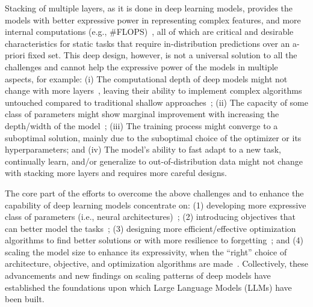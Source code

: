 \documentclass{article}
\newcommand{\citep}{\parencite}
\begin{document}
Stacking of multiple layers, as it is done in deep learning models, provides the models with better expressive power in representing complex features, and more internal computations (e.g., \#FLOPS)~\citep{montufar2014number, poole2016exponential, hestness2017deep}, all of which are critical and desirable characteristics for static tasks that require in-distribution predictions over an a-priori fixed set. This deep design, however, is not a universal solution to all the challenges and cannot help the expressive power of the models in multiple aspects, for example: (i) The computational depth of deep models might not change with more layers~\citep{merrill2022saturated, sanford2024transformers}, leaving their ability to implement complex algorithms untouched compared to traditional shallow approaches~\citep{merrill2024the}; (ii) The capacity of some class of parameters might show marginal improvement with increasing the depth/width of the model~\citep{kaplan2020scaling}; (iii) The training process might converge to a suboptimal solution, mainly due to the suboptimal choice of the optimizer or its hyperparameters; and (iv) The model's ability to fast adapt to a new task, continually learn, and/or generalize to out-of-distribution data might not change with stacking more layers and requires more careful designs. 

The core part of the efforts to overcome the above challenges and to enhance the capability of deep learning models concentrate on: (1) developing more expressive class of parameters (i.e., neural architectures)~\citep{LSTM, fukushima1980neocognitron, transformers, krizhevsky2012imagenet, behrouz2024titans}; (2) introducing objectives that can better model the tasks~\citep{rumelhart1986learning, goodfellow2020generative, alshammari2025unifying, kingma2014autoencoding, hjelm2018learning};  (3) designing more efficient/effective optimization algorithms to find better solutions or with more resilience to forgetting~\citep{kingma2014adam, jordanmuon, gupta2018shampoo, farajtabar2020orthogonal}; and (4) scaling the model size to enhance its expressivity, when the ``right'' choice of architecture, objective, and optimization algorithms are made~\citep{hoffmann2022training, brown2020language, kaplan2020scaling}. Collectively, these advancements and new findings on scaling patterns of deep models have established the foundations upon which Large Language Models (LLMs) have been built.
\end{document}
